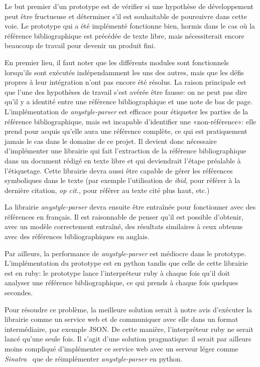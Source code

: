 Le but premier d'un prototype est de vérifier si une hypothèse de développement peut être fructueuse et déterminer s'il est souhaitable de poursuivre dans cette voie. Le prototype qui a été implémenté fonctionne bien, hormis dans le cas où la référence bibliographique est précédée de texte libre, mais nécessiterait encore beaucoup de travail pour devenir un produit fini.

En premier lieu, il faut noter que les différents modules sont fonctionnels lorsqu'ils sont exécutés indépendamment les uns des autres, mais que les défis propres à leur intégration n'ont pas encore été résolus. La raison principale est que l'une des hypothèses de travail s'est avérée être fausse: on ne peut pas dire qu'il y a identité entre une référence bibliographique et une note de bas de page.
L'implémentation de \emph{anystyle-parser} est efficace pour étiqueter les parties de la référence bibliographique, mais est incapable d'identifier une «non-référence»: elle prend pour acquis qu'elle aura une référence complète, ce qui est pratiquement jamais le cas dans le domaine de ce projet. Il devient donc nécessaire d'implémenter une librairie qui fait l'extraction de la référence bibliographique dans un document rédigé en texte libre et qui deviendrait l'étape préalable à l'étiquetage. Cette librairie devra aussi être capable de gérer les références symboliques dans le texte (par exemple l'utilisation de \emph{ibid}, pour référer à la dernière citation, \emph{op cit.}, pour référer au texte cité plus haut, etc.)


La librairie \emph{anystyle-parser} devra ensuite être entraînée pour fonctionner avec des références en français. Il est raisonnable de penser qu'il est possible d'obtenir, avec un modèle correctement entraîné, des résultats similaires à ceux obtenus avec des références bibliographiques en anglais.

Par ailleurs, la performance de \emph{anystyle-parser} est médiocre dans le prototype. L'implémentation du prototype est en python tandis que celle de cette librairie est en ruby: le prototype lance l'interpréteur ruby à chaque fois qu'il doit analyser une référence bibliographique, ce qui prends à chaque fois quelques secondes.

Pour résoudre ce problème, la meilleure solution serait à notre avis d'exécuter la librairie comme un service web et de communiquer avec elle dans un format intermédiaire, par exemple JSON. De cette manière, l'interpréteur ruby ne serait lancé qu'une seule fois. Il s'agit d'une solution pragmatique: il serait par ailleurs moins compliqué d'implémenter ce service web avec un serveur léger comme \emph{Sinatra}~\cite{sinatrarb} que de réimplémenter \emph{anystyle-parser} en python.

